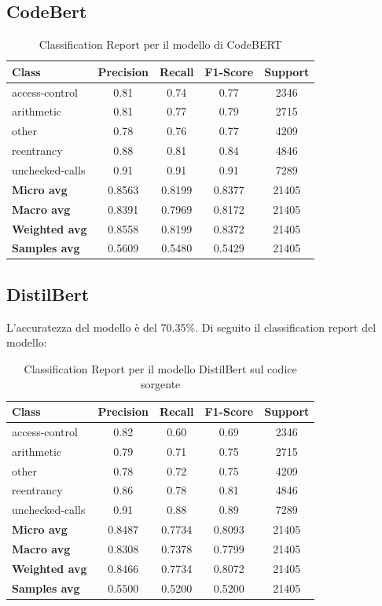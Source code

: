 \documentclass[../../Thesis.tex]{subfiles}
\begin{document}
\subsection{CodeBert}
\begin{table}[H]
    \centering
    \small
    \begin{tabular}{lcccc}
    \hline
    \textbf{Class} & \textbf{Precision} & \textbf{Recall} & \textbf{F1-Score} & \textbf{Support} \\
    \hline
    access-control & 0.81 & 0.74 & 0.77 & 2346 \\
    arithmetic & 0.81 & 0.77 & 0.79 & 2715 \\
    other & 0.78 & 0.76 & 0.77 & 4209 \\
    reentrancy & 0.88 & 0.81 & 0.84 & 4846 \\
    unchecked-calls & 0.91 & 0.91 & 0.91 & 7289 \\
    \hline
    \textbf{Micro avg} & 0.8563 & 0.8199 & 0.8377 & 21405 \\
    \textbf{Macro avg} & 0.8391 & 0.7969 & 0.8172 & 21405 \\
    \textbf{Weighted avg} & 0.8558 & 0.8199 & 0.8372 & 21405 \\
    \textbf{Samples avg} & 0.5609 & 0.5480 & 0.5429 & 21405 \\
    \hline
    \end{tabular}
    \caption{Classification Report per il modello di CodeBERT}
    \end{table}
\subsection{DistilBert}
L'accuratezza del modello è del 70.35\%. Di seguito il classification report del modello:

\begin{table}[H]
    \centering
    \small
    \begin{tabular}{lcccc}
    \hline
    \textbf{Class} & \textbf{Precision} & \textbf{Recall} & \textbf{F1-Score} & \textbf{Support} \\
    \hline
    access-control & 0.82 & 0.60 & 0.69 & 2346 \\
    arithmetic & 0.79 & 0.71 & 0.75 & 2715 \\
    other & 0.78 & 0.72 & 0.75 & 4209 \\
    reentrancy & 0.86 & 0.78 & 0.81 & 4846 \\
    unchecked-calls & 0.91 & 0.88 & 0.89 & 7289 \\
    \hline
    \textbf{Micro avg} & 0.8487 & 0.7734 & 0.8093 & 21405 \\
    \textbf{Macro avg} & 0.8308 & 0.7378 & 0.7799 & 21405 \\
    \textbf{Weighted avg} & 0.8466 & 0.7734 & 0.8072 & 21405 \\
    \textbf{Samples avg} & 0.5500 & 0.5200 & 0.5200 & 21405 \\
    \hline
    \end{tabular}
    \caption{Classification Report per il modello DistilBert sul codice sorgente}
\end{table}
\end{document}
